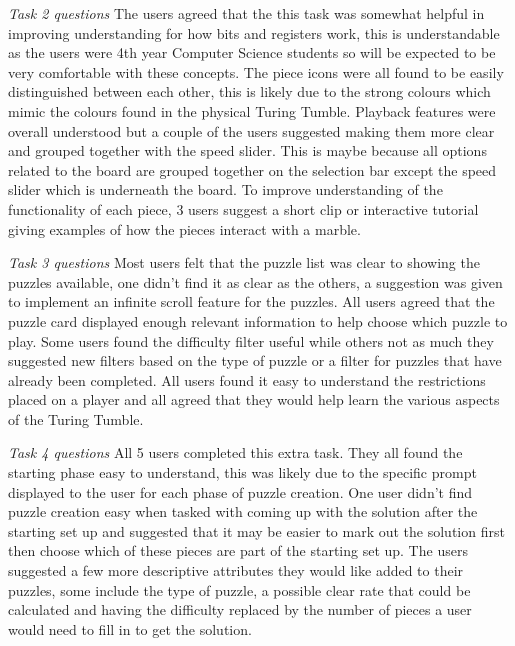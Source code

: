 \documentclass{l4proj}
\begin{document}
\emph{Task 2 questions}
The users agreed that the this task was somewhat helpful in improving understanding for how bits and registers work, this is understandable as the users were 4th year Computer Science students so will be expected to be very comfortable with these concepts. The piece icons were all found to be easily distinguished between each other, this is likely due to the strong colours which mimic the colours found in the physical Turing Tumble. Playback features were overall understood but a couple of the users suggested making them more clear and grouped together with the speed slider. This is maybe because all options related to the board are grouped together on the selection bar except the speed slider which is underneath the board. To improve understanding of the functionality of each piece, 3 users suggest a short clip or interactive tutorial giving examples of how the pieces interact with a marble. 

\emph{Task 3 questions}
Most users felt that the puzzle list was clear to showing the puzzles available, one didn't find it as clear as the others, a suggestion was given to implement an infinite scroll feature for the puzzles. All users agreed that the puzzle card displayed enough relevant information to help choose which puzzle to play. Some users found the difficulty filter useful while others not as much they suggested new filters based on the type of puzzle or a filter for puzzles that have already been completed. All users found it easy to understand the restrictions placed on a player and all agreed that they would help learn the various aspects of the Turing Tumble.

\emph{Task 4 questions}
All 5 users completed this extra task. They all found the starting phase easy to understand, this was likely due to the specific prompt displayed to the user for each phase of puzzle creation. One user didn't find puzzle creation easy when tasked with coming up with the solution after the starting set up and suggested that it may be easier to mark out the solution first then choose which of these pieces are part of the starting set up. The users suggested a few more descriptive attributes they would like added to their puzzles, some include the type of puzzle, a possible clear rate that could be calculated and having the difficulty replaced by the number of pieces a user would need to fill in to get the solution. 
\end{document}
